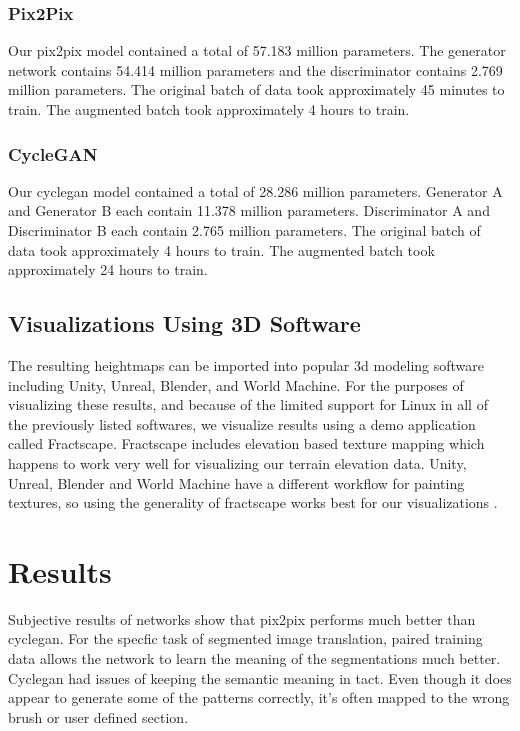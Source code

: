 \documentclass[twocolumn]{article}
\begin{document}
	\subsubsection{Pix2Pix}
		Our pix2pix model contained a total of 57.183 million parameters. The generator network contains 54.414 million parameters and the discriminator contains 2.769 million parameters. The original batch of data took approximately 45 minutes to train. The augmented batch took approximately 4 hours to train.
	
	\subsubsection{CycleGAN}
		Our cyclegan model contained a total of 28.286 million parameters. Generator A and Generator B each contain 11.378 million parameters. Discriminator A and Discriminator B each contain 2.765 million parameters. The original batch of data took approximately 4 hours to train. The augmented batch took approximately 24 hours to train.

	\subsection{Visualizations Using 3D Software}
	
	The resulting heightmaps can be imported into popular 3d modeling software including Unity, Unreal, Blender, and World Machine. For the purposes of visualizing these results, and because of the limited support for Linux in all of the previously listed softwares, we visualize results using a demo application called Fractscape. Fractscape includes elevation based texture mapping which happens to work very well for visualizing our terrain elevation data. Unity, Unreal, Blender and World Machine have a different workflow for painting textures, so using the generality of fractscape works best for our visualizations \cite{starscenesoftware2006}.

	\section{Results}
	
	Subjective results of networks show that pix2pix performs much better than cyclegan. For the specfic task of segmented image translation, paired training data allows the network to learn the meaning of the segmentations much better. Cyclegan had issues of keeping the semantic meaning in tact. Even though it does appear to generate some of the patterns correctly, it's often mapped to the wrong brush or user defined section.
	
\end{document}
